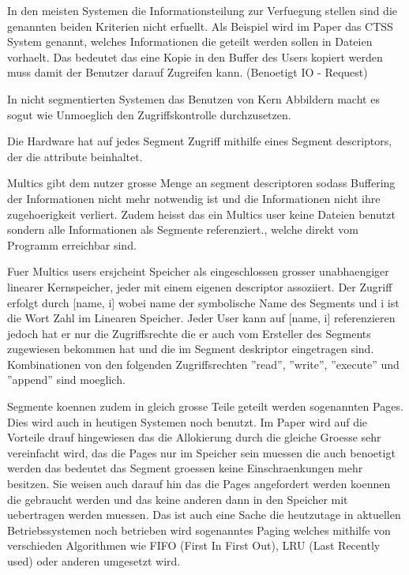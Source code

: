 \documentclass[9pt,technote]{IEEEtran}
\begin{document}
  In den meisten Systemen die Informationsteilung zur Verfuegung stellen sind die genannten beiden Kriterien nicht erfuellt.
  Als Beispiel wird im Paper \cite{inproc:multics} das CTSS System genannt, welches Informationen die geteilt werden sollen in Dateien vorhaelt.
  Das bedeutet das eine Kopie in den Buffer des Users kopiert werden muss damit der Benutzer darauf Zugreifen kann. (Benoetigt IO - Request)
  
  In nicht segmentierten Systemen das Benutzen von Kern Abbildern macht es sogut wie Unmoeglich den Zugriffskontrolle durchzusetzen.
  
 Die Hardware hat auf jedes Segment Zugriff mithilfe eines Segment descriptors, der die attribute beinhaltet.
 
 Multics gibt dem nutzer grosse Menge an segment descriptoren sodass Buffering der Informationen nicht mehr notwendig ist und die Informationen nicht
 ihre zugehoerigkeit verliert. Zudem heisst das ein Multics user keine Dateien benutzt sondern alle Informationen als Segmente referenziert., welche direkt vom Programm erreichbar sind.
 
 Fuer Multics users ersjcheint Speicher als eingeschlossen grosser unabhaengiger linearer Kernspeicher, jeder mit einem eigenen descriptor assoziiert. 
 Der Zugriff erfolgt durch [name, i] wobei name der symbolische Name des Segments und i ist die Wort Zahl im Linearen Speicher.
 Jeder User kann auf [name, i] referenzieren jedoch hat er nur die Zugriffsrechte die er auch vom Ersteller des Segments zugewiesen bekommen hat
 und die im Segment deskriptor eingetragen sind. Kombinationen von den folgenden Zugriffsrechten ''read'', ''write'', ''execute'' und ''append'' sind moeglich.
 
 Segmente koennen zudem in gleich grosse Teile geteilt werden sogenannten Pages. Dies wird auch in heutigen Systemen noch benutzt.
 Im Paper \cite{inproc:multics} wird auf die Vorteile drauf hingewiesen das die Allokierung durch die gleiche Groesse sehr vereinfacht wird,
 das die Pages nur im Speicher sein muessen die auch benoetigt werden das bedeutet das Segment groessen keine Einschraenkungen mehr besitzen.
 Sie weisen auch darauf hin das die Pages angefordert werden koennen die gebraucht werden und das keine anderen dann in den Speicher mit uebertragen werden muessen.
 Das ist auch eine Sache die heutzutage in aktuellen Betriebssystemen noch betrieben wird sogenanntes Paging welches mithilfe von
 verschieden Algorithmen wie FIFO (First In First Out), LRU (Last Recently used) oder anderen umgesetzt wird.
 
\end{document}

